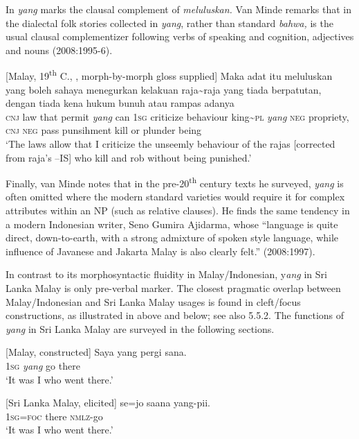 In  \textit{yang} marks the clausal complement of \textit{meluluskan.} Van Minde remarks that in the dialectal folk stories collected in \citet{Toer1982} \textit{yang}, rather than standard \textit{bahwa, }is the usual clausal complementizer following verbs of speaking and cognition, adjectives and nouns (2008:1995-6).

\ea\label{smith:ex:67}
{}[Malay, 19\textsuperscript{th} C., \citet[1992]{vanMinde2008}, morph-by-morph gloss supplied]
\gll Maka adat itu meluluskan yang boleh sahaya menegurkan kelakuan raja\~{}raja yang tiada berpatutan, dengan tiada kena hukum bunuh atau rampas adanya \\ 
\textsc{cnj} law that permit \textit{yang} can 1\textsc{sg} criticize behaviour king\~{}\textsc{pl} \textit{yang} \textsc{neg} propriety, \textsc{cnj} \textsc{neg} pass punsihment kill or plunder being\\
`The laws allow that I criticize the unseemly behaviour of the rajas [corrected from raja's --IS] who kill and rob without being punished.'
\z

Finally, van Minde notes that in the pre-20\textsuperscript{th} century texts he surveyed, \textit{yang} is often omitted where the modern standard varieties would require it for complex attributes within an NP (such as relative clauses). He finds the same tendency in a modern Indonesian writer, Seno Gumira Ajidarma, whose ``language is quite direct, down-to-earth, with a strong admixture of spoken style language, while influence of Javanese and Jakarta Malay is also clearly felt.'' (2008:1997).

In contrast to its morphosyntactic fluidity in Malay/Indonesian, y\textit{ang }in Sri Lanka Malay is only pre-verbal marker. The closest pragmatic overlap between Malay/Indonesian and Sri Lanka Malay usages is found in cleft/focus constructions, as illustrated in  above  and  below; see also 5.5.2. The functions of \textit{yang} in Sri Lanka Malay are surveyed in the following sections.

\ea\label{smith:ex:68}
{}[Malay, constructed]
\gll Saya yang pergi sana.\\
1\textsc{sg} \textit{yang} go there\\
`It was I who went there.'
\z

\ea\label{smith:ex:69}
{}[Sri Lanka Malay, elicited]
\gll se=jo saana yang-pii. \\
1\textsc{sg}=\textsc{foc} there \textsc{nmlz}-go\\
`It was I who went there.'
\z

